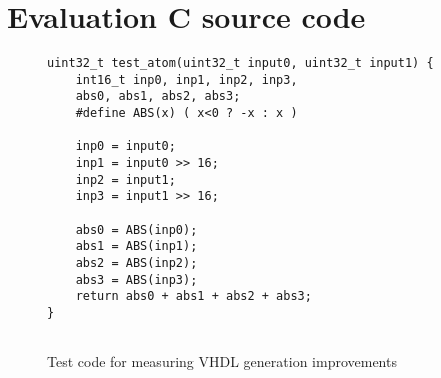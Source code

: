 \section{Evaluation C source code}
\begin{figure}
	\centering
	\begin{lstlisting}[frame=single]
uint32_t test_atom(uint32_t input0, uint32_t input1) {
	int16_t inp0, inp1, inp2, inp3,
	abs0, abs1, abs2, abs3;
	#define ABS(x) ( x<0 ? -x : x )
	
	inp0 = input0;
	inp1 = input0 >> 16;
	inp2 = input1;
	inp3 = input1 >> 16;
	
	abs0 = ABS(inp0);
	abs1 = ABS(inp1);
	abs2 = ABS(inp2);
	abs3 = ABS(inp3);
	return abs0 + abs1 + abs2 + abs3;
}
	
	\end{lstlisting}
	\caption{Test code for measuring VHDL generation improvements}
	\label{code:vhdl-eval}
\end{figure}